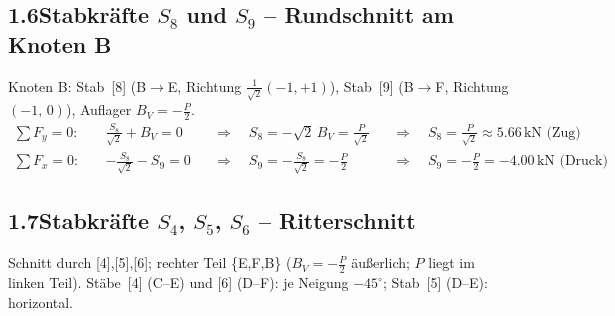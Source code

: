 \documentclass[a4paper,11pt]{article}
\begin{document}
\begin{center}
\end{center}


\subsection*{1.6\quad Stabkräfte $S_8$ und $S_9$ -- Rundschnitt am Knoten B}

Knoten B: Stab~[8] (B$\to$E, Richtung $\tfrac{1}{\sqrt{2}}(-1,+1)$),
Stab~[9] (B$\to$F, Richtung $(-1,\,0)$), Auflager $B_V = -\tfrac{P}{2}$.
\begin{align*}
  \sum F_y = 0:\quad & \tfrac{S_8}{\sqrt{2}} + B_V = 0
    &&\Rightarrow\quad S_8 = -\sqrt{2}\,B_V = \tfrac{P}{\sqrt{2}}
       &&\Rightarrow\quad \boxed{S_8 = \tfrac{P}{\sqrt{2}} \approx 5.66\,\text{kN (Zug)}} \\
  \sum F_x = 0:\quad & -\tfrac{S_8}{\sqrt{2}} - S_9 = 0
    &&\Rightarrow\quad S_9 = -\tfrac{S_8}{\sqrt{2}} = -\tfrac{P}{2}
       &&\Rightarrow\quad \boxed{S_9 = -\tfrac{P}{2} = -4.00\,\text{kN (Druck)}}
\end{align*}

\subsection*{1.7\quad Stabkräfte $S_4$, $S_5$, $S_6$ -- Ritterschnitt}

Schnitt durch [4],[5],[6]; rechter Teil \{E,F,B\} ($B_V = -\tfrac{P}{2}$ äußerlich; $P$ liegt im linken Teil).
Stäbe~[4] (C--E) und [6] (D--F): je Neigung $-45^\circ$; Stab~[5] (D--E): horizontal.
\end{document}
